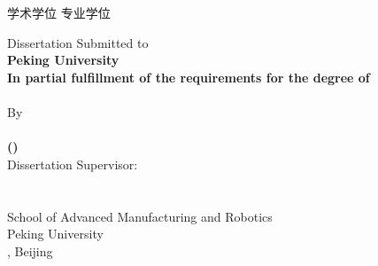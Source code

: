 {\begin{titlepage}
\begin{center}
{                \uncheckedbox 学术学位 \hspace{1.0cm} \checkedbox 专业学位
            \fi\\
            \vspace*{1.2cm}
            \typedate \@cdate
            }
        \end{center}
        \cleardoublepage
        \newpage
        \thispagestyle{empty}
        \begin{center}
            \vspace*{-0.5cm}%
            {\typetitleen
            \begin{center} { \@etitle} \end{center}}
            \vspace*{2cm}
            {\typeenglish
            Dissertation Submitted to \\
            \textbf{Peking University} \\
            \vspace*{0.6cm}
            \textbf{In partial fulfillment of the requirements for the degree of} \\
            \@edegree \\
            \vspace*{2.2cm}
            By \\
            \textbf{\@eauthor}\textbf{\@exuewei}
            \\
            \textbf{(\@esubject)} \\}
            \vspace*{0.8cm}
            {\typeenglishlarge
            Dissertation Supervisor: \textbf{\@esupervisor} \\ \quad \\
            \@edepartment \\
            School of Advanced Manufacturing and Robotics \\
            Peking University \\
            \@edate, Beijing \\}
        \end{center}

        \cleardoublepage
        \newpage
        \thispagestyle{empty}
    \end{titlepage}
}
